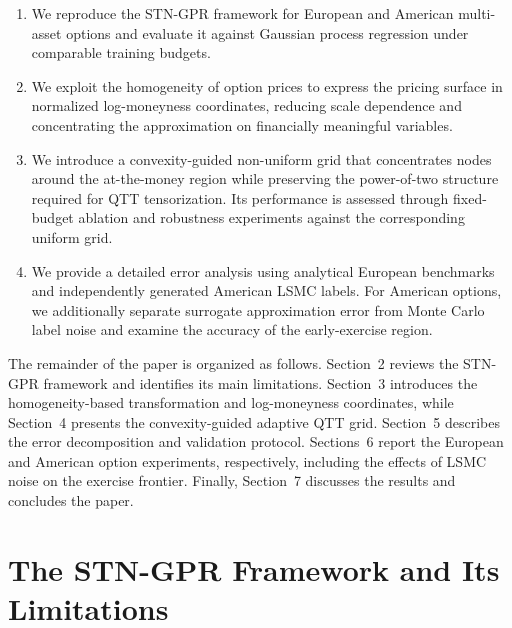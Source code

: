 \documentclass{article}
\numberwithin{equation}{subsection}
\theoremstyle{definition}
\theoremstyle{remark}
\begin{document}
\begin{enumerate}
\item We reproduce the STN-GPR framework for European and American multi-asset options and evaluate it against Gaussian process regression under comparable training budgets.
\item We exploit the homogeneity of option prices to express the pricing surface in normalized log-moneyness coordinates, reducing scale dependence and concentrating the approximation on financially meaningful variables.
\item We introduce a convexity-guided non-uniform grid that concentrates nodes around the at-the-money region while preserving the power-of-two structure required for QTT tensorization. Its performance is assessed through fixed-budget ablation and robustness experiments against the corresponding uniform grid.
\item We provide a detailed error analysis using analytical European benchmarks and independently generated American LSMC labels. For American options, we additionally separate surrogate approximation error from Monte Carlo label noise and examine the accuracy of the early-exercise region.
\end{enumerate}
The remainder of the paper is organized as follows. Section~2 reviews the STN-GPR framework and identifies its main limitations. Section~3 introduces the homogeneity-based transformation and log-moneyness coordinates, while Section~4 presents the convexity-guided adaptive QTT grid. Section~5 describes the error decomposition and validation protocol. Sections~6 report the European and American option experiments, respectively, including the effects of LSMC noise on the exercise frontier. Finally, Section~7 discusses the results and concludes the paper.
\section{The STN-GPR Framework and Its Limitations}
\label{sec:stn-framework}
\end{document}
